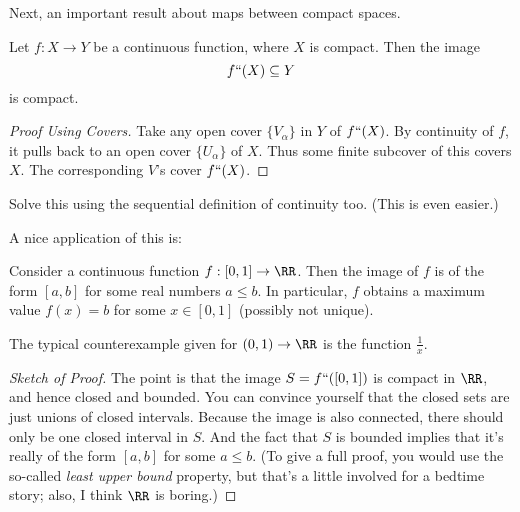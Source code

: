 Next, an important result about maps between compact spaces.
\begin{theorem}
	Let $f : X \to Y$ be a continuous function, where $X$ is compact.
	Then the image \[ f``(X) \subseteq Y \] is compact.
\end{theorem}
\begin{proof}[Proof Using Covers]
	Take any open cover $\{V_\alpha\}$ in $Y$ of $f``(X)$.
	By continuity of $f$, it pulls back to an open cover $\{U_\alpha\}$ of $X$.
	Thus some finite subcover of this covers $X$.
	The corresponding $V$'s cover $f``(X)$.
\end{proof}
\begin{ques}
	Solve this using the sequential definition of continuity too.
	(This is even easier.)
\end{ques}

A nice application of this is:
\begin{corollary}
	Consider a continuous function $f: [0,1] \to \RR$.
	Then the image of $f$ is of the form $[a,b]$ for some real numbers $a \le b$.
	In particular, $f$ obtains a maximum value $f(x) = b$
	for some $x \in [0,1]$ (possibly not unique).
\end{corollary}
The typical counterexample given for $(0,1) \to \RR$ is the function $\frac 1x$.

\begin{proof}[Sketch of Proof]
	The point is that the image $S = f``([0,1])$ is compact in $\RR$, and hence closed and bounded.
	You can convince yourself that the closed sets are just unions of closed intervals.
	Because the image is also connected, there should only be one closed interval in $S$.
	And the fact that $S$ is bounded implies that it's really of the form $[a,b]$ for some $a \le b$.
	(To give a full proof, you would use the so-called \emph{least upper bound} property,
	but that's a little involved for a bedtime story; also, I think $\RR$ is boring.)
\end{proof}

